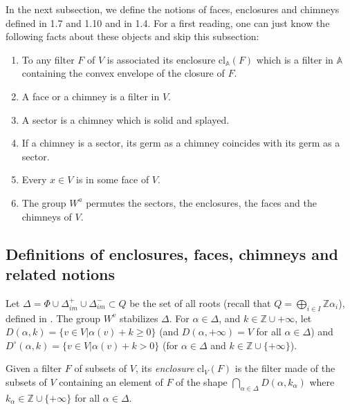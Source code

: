 \documentclass[12pt]{article}
\theoremstyle{plain}
\theoremstyle{definition}
\newcommand{\Z}{\mathbb{Z}}
\begin{document}
In the next subsection, we define the notions of faces, enclosures and chimneys defined in \cite{rousseau2011masures} 1.7 and 1.10 and in  \cite{gaussent2014spherical} 1.4. For a first reading, one can just know the following facts about these objects and skip this subsection:

\begin{enumerate}

\item To any filter $F$ of $V$ is associated its enclosure $\mathrm{cl}_{\mathbb{A}}(F)$ which is a filter in $\mathbb{A}$ containing the convex envelope of the closure of $F$.

\item A face or a chimney is a filter in $V$.



\item A sector is a chimney which is solid and splayed.

\item If a chimney is a sector, its germ as a chimney coincides with its germ as a sector. 


\item Every $x\in V\mathrm{}$ is in some face of $V$.




\item The group $W^a$ permutes the sectors, the enclosures, the faces and the chimneys of $V$.\label{fait sur les faces}

\end{enumerate}


\subsection{Definitions of enclosures, faces, chimneys and related notions}


 Let $\Delta=\Phi\cup\Delta_{im}^+\cup\Delta_{im}^-\subset Q$ be the set of all roots (recall that $Q=\bigoplus_{i\in I}\Z\alpha_i$), defined in  \cite{kac1994infinite}. The group $W^v$ stabilizes $\Delta$. For $\alpha\in \Delta$, and $k\in \Z\cup{+\infty}$, let $D(\alpha,k)=\{v\in V| \alpha(v)+k\geq 0\}$ (and $D(\alpha,+\infty)=V\mathrm{}$ for all $\alpha\in \Delta$) and $D^\circ(\alpha,k)=\{v\in V| \alpha(v)+k > 0\}$ (for $\alpha\in \Delta$ and $k\in \Z\cup\{+\infty\}$).

Given a filter $F$ of subsets of $V$, its \textit{enclosure} $\mathrm{cl}_V\mathrm{}(F)$ is the filter made of the subsets of $V$ containing an element of $F$ of the shape $\bigcap_{\alpha\in \Delta}D(\alpha,k_\alpha)$ where $k_\alpha\in \Z\cup\{+\infty\}$ for all $\alpha\in \Delta$.
\end{document}
